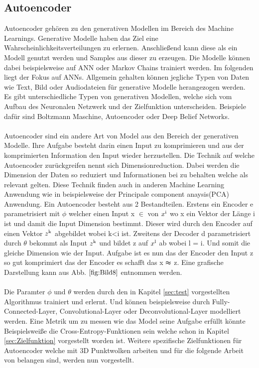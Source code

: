 \documentclass{llncs}
\begin{document}
	\subsection{Autoencoder}\label{sec:autoencoder}

	Autoencoder gehören zu den generativen Modellen im Bereich des Machine Learnings. Generative Modelle haben das Ziel eine Wahrscheinlichkeitsverteilungen zu erlernen. Anschließend kann diese als ein Modell genutzt werden und Samples aus dieser zu erzeugen. Die Modelle können dabei beispielsweise auf ANN oder Markov Chains trainiert werden\cite{Grundlagen}. Im folgenden liegt der Fokus auf ANNs. Allgemein gehalten können jegliche Typen von Daten wie Text, Bild oder Audiodateien für generative Modelle herangezogen werden. Es gibt unterschiedliche Typen von generativen Modellen, welche sich vom Aufbau des Neuronalen Netzwerk und der Zielfunktion unterscheiden. Beispiele dafür sind Boltzmann Maschine, Autoencoder oder Deep Belief Networks\cite{Grundlagen}. 
	\\\\
	Autoencoder sind ein andere Art von Model aus den Bereich der generativen Modelle. Ihre Aufgabe besteht darin einen Input zu komprimieren und aus der komprimierten Information den Input wieder herzustellen. Die Technik auf welche Autoencoder zurückgreifen nennt sich Dimensionreduction. Dabei werden die Dimension der Daten so reduziert und Informationen bei zu behalten welche als relevant gelten. Diese Technik finden auch in anderen Machine Learning Anwendung wie in beispielsweise der Principale component anaysis(PCA) Anwendung\cite{dimreduction}.  Ein Autoencoder besteht aus 2 Bestandteilen. Erstens ein Encoder e parametrisiert mit $\phi$ welcher einen Input x $\in$ von $x\textsuperscript{i}$ wo x ein Vektor der Länge i ist und damit die Input Dimension bestimmt. Dieser wird durch den Encoder auf einen Vektor $z\textsuperscript{k}$ abgebildet wobei k<i ist. Zweitens der Decoder d parametrisiert durch  $\theta$ bekommt als Input $z\textsuperscript{k}$ und bildet z auf $x\textsuperscript{l}$ ab wobei l = i. Und somit die gleiche Dimension wie der Input. Aufgabe ist es nun das der Encoder den Input z so gut komprimiert das der  Encoder es schafft das x $\thickapprox$ z. Eine grafische Darstellung kann aus Abb. $\ref{fig:Bild8}$ entnommen werden\cite{Grundlagen}. 
	\\\\
	Die Paramter $\phi$ und $\theta$ werden durch den in Kapitel \ref{sec:test} vorgestellten Algorithmus trainiert und erlernt. Und können beispielsweise durch Fully-Connected-Layer, Convolutional-Layer oder Deconvolutional-Layer modelliert werden. Eine Metrik um zu messen wie das Model seine Aufgabe erfüllt könnte Beispielsweiße die Cross-Entropy-Funktionen sein welche schon in Kapitel \ref{sec:Zielfunktion} vorgestellt worden ist. Weitere spezifische Zielfunktionen für Autoencoder welche mit 3D Punktwolken arbeiten und für die folgende Arbeit von belangen sind, werden nun vorgestellt.
\end{document}
